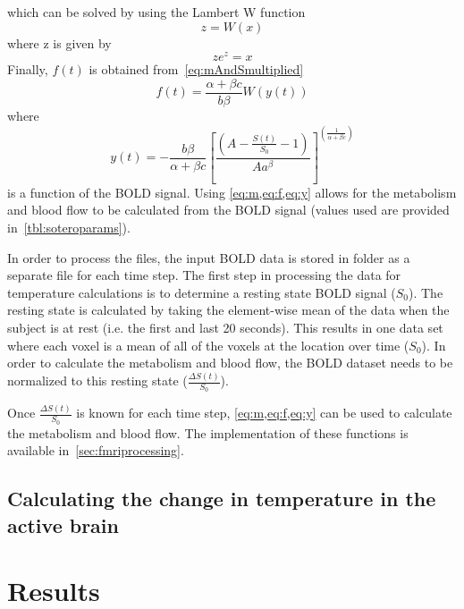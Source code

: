   which can be solved by using the Lambert W function
    \begin{equation} \label{eq:lambertW}
      z=W(x)
    \end{equation}
  where z is given by
    \begin{equation} \label{eq:lambertWsetup}
      z e^z = x
    \end{equation}
  Finally, $f(t)$ is obtained from~\cref{eq:mAndSmultiplied}
    \begin{equation} \label{eq:f}
      f(t)=\frac{\alpha+\beta c}{b \beta}W(y(t))
    \end{equation}
  where
    \begin{equation} \label{eq:y} 
    	y(t)=-\frac{b \beta}{\alpha+\beta c} \left[\frac{(A-\frac{S(t)}{S_{0}}-1)}{A a^{\beta}}\right]^{\left(\frac{1}{\alpha+\beta c}\right)} 
    \end{equation}
  is a function of the BOLD signal.  Using \cref{eq:m,eq:f,eq:y} allows for the metabolism and blood flow to be calculated from the BOLD signal (values used are provided in~\cref{tbl:soteroparams}).
  
    In order to process the files, the input BOLD data is stored in folder as a separate file for each time step.  The first step in processing the data for temperature calculations is to determine a resting state BOLD signal ($S_0$).  The resting state is calculated by taking the element-wise mean of the data when the subject is at rest (i.e. the first and last 20 seconds).  This results in one data set where each voxel is a mean of all of the voxels at the location over time ($S_0$).  In order to calculate the metabolism and blood flow, the BOLD dataset needs to be normalized to this resting state ($\frac{\Delta S(t)}{S_0}$).  
    
    Once $\frac{\Delta S(t)}{S_0}$ is known for each time step, \cref{eq:m,eq:f,eq:y} can be used to calculate the metabolism and blood flow. The implementation of these functions is available in~\cref{sec:fmriprocessing}. 

    \subsection{\label{sec:calcT} Calculating the change in temperature in the active brain}
  \section{\label{sec:results} Results} 
